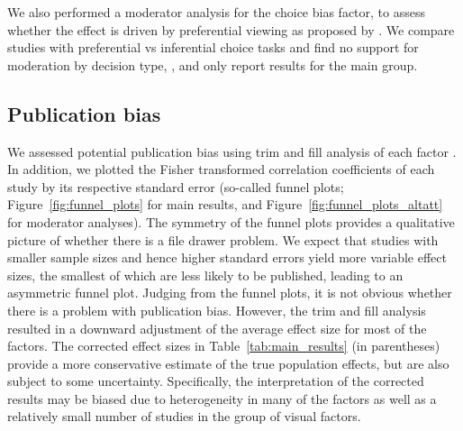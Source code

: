 We also performed a moderator analysis for the choice bias factor, to assess whether the effect is driven by preferential viewing as proposed by \cite{shimojo2003a}. We compare studies with preferential vs inferential choice tasks and find no support for moderation by decision type, , and only report results for the main group. 

\subsection{Publication bias}

We assessed potential publication bias using trim and fill analysis of each factor \citep{duval2000trim}. In addition, we plotted the  Fisher transformed correlation coefficients of each study by its respective standard error (so-called funnel plots; Figure~\ref{fig:funnel_plots} for main results, and Figure~\ref{fig:funnel_plots_altatt} for moderator analyses). The symmetry of the funnel plots provides a qualitative picture of whether there is a file drawer problem. We expect that studies with smaller sample sizes and hence higher standard errors yield more variable effect sizes, the smallest of which are less likely to be published, leading to an asymmetric funnel plot. Judging from the funnel plots, it is not obvious whether there is a problem with publication bias. However, the trim and fill analysis resulted in a downward adjustment of the average effect size for most of the factors. The corrected effect sizes in Table~\ref{tab:main_results} (in parentheses) provide a more conservative estimate of the true population effects, but are also subject to some uncertainty. Specifically, the interpretation of the corrected results may be biased due to heterogeneity in many of the factors as well as a relatively small number of studies in the group of visual factors. 




